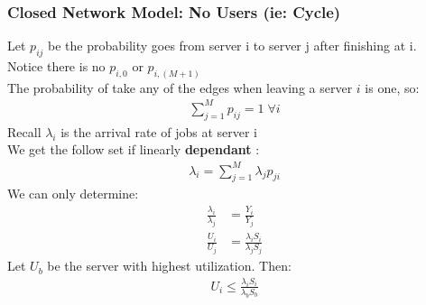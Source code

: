 \subsubsection{Closed Network Model: No Users (ie: Cycle)}
Let $p_{ij}$ be the probability goes from server i to server j after finishing at i. \\
Notice there is no $p_{i,0}$ or $p_{i,(M+1)}$ \\
The probability of take any of the edges when leaving a server $i$ is one, so:
\begin{align*} 
	\sum_{j=1}^{M} p_{ij} = 1 \; \forall i
\end{align*} 
Recall $\lambda_i$ is the arrival rate of jobs at server i \\
We get the follow set if linearly {\bf dependant} :
\begin{align*} 
	\lambda_i = \sum_{j=1}^M \lambda_j p_{ji}
\end{align*} 
We can only determine:
\begin{align*} 
	\frac{\lambda_i}{\lambda_j} &= \frac{Y_i}{Y_j} \\
	\frac{U_i}{U_j} &= \frac{\lambda_i S_i}{\lambda_j S_j}
\end{align*} 
Let $U_b$ be the server with highest utilization. Then:
\begin{align*} 
	U_i \le \frac{\lambda_i S_i}{\lambda_b S_b}
\end{align*} 

